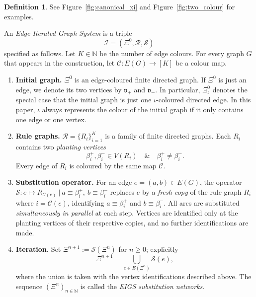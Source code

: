 \documentclass{article}
\theoremstyle{plain}
\theoremstyle{definition}
\newtheorem{definition}[theorem]{Definition}
\begin{document}
\begin{definition}\label{definition:EIGS}
See Figure~\ref{fig:canonical_xi} and Figure~\ref{fig:two_colour} for examples.

An \emph{Edge Iterated Graph System} is a triple
\[
   \mathscr I=(\Xi^{0},\mathcal R,\mathcal S)
\]
specified as follows.
Let $K\in\mathbb N$ be the number of edge colours.
For every graph $G$ that appears in the construction, let
$
   \mathscr{C} : E(G) \longrightarrow[K]
$
be a colour map.

\begin{enumerate}
\item \textbf{Initial graph.}
      $\Xi^{0}$ is an edge-coloured finite directed graph.
      If $\Xi^{0}$ is just an edge, we denote its two vertices by $\mathfrak v_+$ and $\mathfrak v_-$.
      In particular, $\Xi_{\iota}^0$ denotes the special case that the initial graph is just one $\iota$-coloured directed edge.
      In this paper, $\iota$ always represents the colour of the initial graph if it only contains one edge or one vertex.

\item \textbf{Rule graphs.}
      $\mathcal{R} = \{ R_i \}_{i=1}^{K}$ is a family of finite directed graphs.
      Each $R_i$ contains two \emph{planting vertices}
      \[
         \beta_i^{+},\beta_i^{-} \in  V(R_i)
         \quad\&\quad
         \beta_i^{+}\neq\beta_i^{-}.
      \]
      Every edge of $R_i$ is coloured by the same map $\mathscr{C}$.

\item \textbf{Substitution operator.}
      For an edge $e=(a,b)\in E(G)$, the operator
      $
         \mathcal S\colon e\longmapsto R_{\mathscr{C}(e)}  \ \big|\
         a\equiv\beta_i^{+},\ b\equiv\beta_i^{-}
      $
      replaces $e$ by a \emph{fresh copy} of the rule graph $R_i$ where \(i=\mathscr C(e)\), identifying
      $
         a\equiv\beta_i^{+}
      $ and
      $
         b\equiv\beta_i^{-}.
      $
      All arcs are substituted \emph{simultaneously in parallel} at each step.
      Vertices are identified only at the planting vertices of their respective copies, and no further identifications are made.

\item \textbf{Iteration.}
      Set $\Xi^{n+1}:=\mathcal S(\Xi^{n})$ for $n\ge 0$; explicitly
      \[
         \Xi^{n+1}
         =
         \bigcup_{e\in E(\Xi^{n})}\mathcal S(e),
      \]
      where the union is taken with the vertex identifications described above.
      The sequence $(\Xi^{n})_{n\in\mathbb N}$ is called the \emph{EIGS substitution networks}.
\end{enumerate}
\end{definition}
\end{document}
